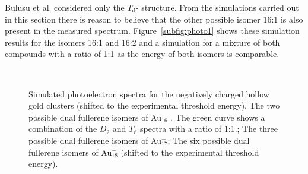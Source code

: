 Bulusu et al. considered only the $T_\text{d}$- structure. From the
simulations carried out in this section there is reason to believe that the
other possible isomer 16:1 is also present in the measured spectrum.
Figure~\ref{subfig:photo1} shows these simulation results for the isomers 16:1
and 16:2 and a simulation for a mixture of both compounds with a ratio of 1:1 as
the energy of both isomers is comparable. 
%
\begin{figure}[htb]
    \begin{center}
        \hfill
        \\
    \caption{Simulated photoelectron spectra for the negatively charged hollow gold
        clusters (shifted to the experimental threshold energy).
        \protect{} The two possible dual fullerene isomers of
        Au$_{16}^-$ . The green curve shows a combination of the $D_\mathrm{2}$ and
        $T_\mathrm{d}$ spectra with a ratio of 1:1.; \protect{}
        The three possible dual fullerene isomers of Au$_{17}^-$;
        \protect{} The six possible dual fullerene isomers of
        Au$_{18}^-$ (shifted to the experimental threshold energy).}
      \label{fig:photo_Au16}
    \end{center}
    \end{figure}
